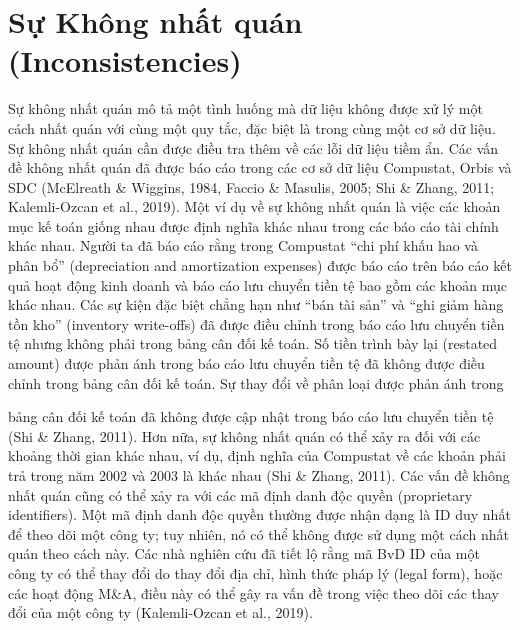 \section{Sự Không nhất quán (Inconsistencies)}

Sự không nhất quán mô tả một tình huống mà dữ liệu không được xử lý một cách nhất quán với cùng một quy tắc, đặc biệt là trong cùng một cơ sở dữ liệu. Sự không nhất quán cần được điều tra thêm về các lỗi dữ liệu tiềm ẩn. Các vấn đề không nhất quán đã được báo cáo trong các cơ sở dữ liệu Compustat, Orbis và SDC (McElreath \& Wiggins, 1984, Faccio \& Masulis, 2005; Shi \& Zhang, 2011; Kalemli-Ozcan et al., 2019). Một ví dụ về sự không nhất quán là việc các khoản mục kế toán giống nhau được định nghĩa khác nhau trong các báo cáo tài chính khác nhau. Người ta đã báo cáo rằng trong Compustat ``chi phí khấu hao và phân bổ'' (depreciation and amortization expenses) được báo cáo trên báo cáo kết quả hoạt động kinh doanh và báo cáo lưu chuyển tiền tệ bao gồm các khoản mục khác nhau. Các sự kiện đặc biệt chẳng hạn như ``bán tài sản'' và ``ghi giảm hàng tồn kho'' (inventory write-offs) đã được điều chỉnh trong báo cáo lưu chuyển tiền tệ nhưng không phải trong bảng cân đối kế toán. Số tiền trình bày lại (restated amount) được phản ánh trong báo cáo lưu chuyển tiền tệ đã không được điều chỉnh trong bảng cân đối kế toán. Sự thay đổi về phân loại được phản ánh trong

bảng cân đối kế toán đã không được cập nhật trong báo cáo lưu chuyển tiền tệ (Shi \& Zhang, 2011). Hơn nữa, sự không nhất quán có thể xảy ra đối với các khoảng thời gian khác nhau, ví dụ, định nghĩa của Compustat về các khoản phải trả trong năm 2002 và 2003 là khác nhau (Shi \& Zhang, 2011). Các vấn đề không nhất quán cũng có thể xảy ra với các mã định danh độc quyền (proprietary identifiers). Một mã định danh độc quyền thường được nhận dạng là ID duy nhất để theo dõi một công ty; tuy nhiên, nó có thể không được sử dụng một cách nhất quán theo cách này. Các nhà nghiên cứu đã tiết lộ rằng mã BvD ID của một công ty có thể thay đổi do thay đổi địa chỉ, hình thức pháp lý (legal form), hoặc các hoạt động M\&A, điều này có thể gây ra vấn đề trong việc theo dõi các thay đổi của một công ty (Kalemli-Ozcan et al., 2019).

